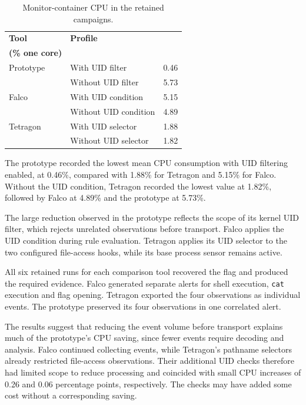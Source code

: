   \begin{table}[H]
      \centering
      \small
      \renewcommand{\arraystretch}{1.14}
      \begin{tabularx}{\textwidth}{@{}l X r@{}}
          \toprule
          \textbf{Tool} & \textbf{Profile} &
          \shortstack{\textbf{Mean CPU}\\\textbf{(\% one core)}} \\
          \midrule
          Prototype & With UID filter    & 0.46 \\
                    & Without UID filter & 5.73  \\
          \addlinespace
          Falco     & With UID condition    & 5.15  \\
                    & Without UID condition & 4.89  \\
          \addlinespace
          Tetragon  & With UID selector    & 1.88 \\
                    & Without UID selector & 1.82 \\
          \bottomrule
      \end{tabularx}
      \caption{Monitor-container CPU in the retained campaigns.}
      \label{tab:evaluation-tool-comparison}
  \end{table}

  The prototype recorded the lowest mean CPU consumption with UID filtering
  enabled, at 0.46\%, compared with 1.88\% for Tetragon and 5.15\% for Falco.
  Without the UID condition, Tetragon recorded the lowest value at 1.82\%,
  followed by Falco at 4.89\% and the prototype at 5.73\%.

  The large reduction observed in the prototype reflects the scope of its
  kernel UID filter, which rejects unrelated observations before transport.
  Falco applies the UID condition during rule evaluation. Tetragon applies
  its UID selector to the two configured file-access hooks, while its base
  process sensor remains active.

  All six retained runs for each comparison tool recovered the flag and
  produced the required evidence. Falco generated separate alerts for shell
  execution, \texttt{cat} execution and flag opening. Tetragon exported the
  four observations as individual events. The prototype preserved its four
  observations in one correlated alert.

  The results suggest that reducing the event volume before transport explains
  much of the prototype's CPU saving, since fewer events require decoding and
  analysis. Falco continued collecting events, while Tetragon's pathname
  selectors already restricted file-access observations. Their additional UID
  checks therefore had limited scope to reduce processing and coincided with
  small CPU increases of 0.26 and 0.06 percentage points, respectively.
  The checks may have added some cost without a corresponding saving.

